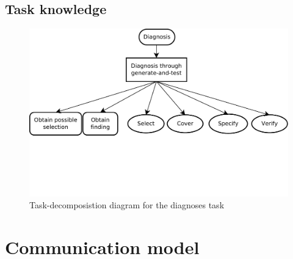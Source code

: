 \documentclass[a4paper,10pt]{article}
\begin{document}
\subsection{Task knowledge}
\begin{figure}[htbp]
	\centering
		\includegraphics[width=1.00\textwidth, trim = 0 130 0 0, clip = true]{taskDecomposition.pdf}
	\caption{Task-decomposistion diagram for the diagnoses task}
	\label{fig:taskDecomposition}
\end{figure}



\section{Communication model}
\end{document}
